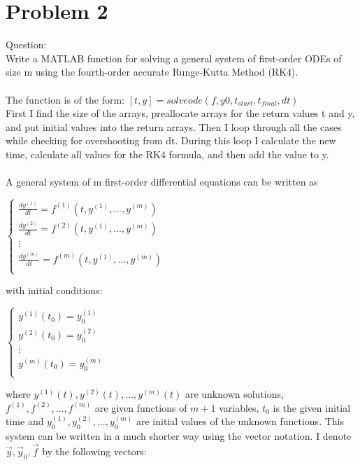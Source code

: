 \documentclass[12pt]{article}
\begin{document}
\section{Problem 2}\label{sec::Problem 2}
Question:\\
Write a MATLAB function for solving a general system of first-order ODEs of size m using the fourth-order accurate Runge-Kutta Method (RK4).\\
\\The function is of the form: $[t, y] = solveode(f, y0, t_{start}, t_{final}, dt)$\\
First I find the size of the arrays, preallocate arrays for the return values t and y, and put initial values into the return arrays.  Then I loop through all the cases while checking for overshooting from dt.  During this loop I calculate the new time, calculate all values for the RK4 formula, and then add the value to y.\\
\\A general system of m first-order differential equations can be written as
\begin{center}
$\begin{cases} 
\frac{dy^{(1)}}{dt} = f^{(1)}(t,y^{(1)},...,y^{(m)})  \\
\frac{dy^{(2)}}{dt} = f^{(2)}(t,y^{(1)},...,y^{(m)})  \\
\vdots \\
\frac{dy^{(m)}}{dt} = f^{(m)}(t,y^{(1)},...,y^{(m)})  \\
 \end{cases}$
\end{center}
with initial conditions:
\begin{center}
$\begin{cases} 
y^{(1)}(t_0) = y_0^{(1)} \\
y^{(2)}(t_0) = y_0^{(2)} \\
\vdots \\
y^{(m)}(t_0) = y_0^{(m)} \\
 \end{cases}$
\end{center}
where $y^{(1)}(t),y^{(2)}(t), ... , y^{(m)}(t)$ are unknown solutions, $f^{(1)}, f^{(2)}, ... , f^{(m)}$ are given functions of $m+1$ variables, $t_0$ is the given initial time and $y_0^{(1)},y_0^{(2)}, ... , y_0^{(m)}$ are initial values of the unknown functions.  This system can be written in a much shorter way using the vector notation. I denote $\overrightarrow{y},\overrightarrow{y}_0, \overrightarrow{f}$ by the following vectors:
\end{document}
